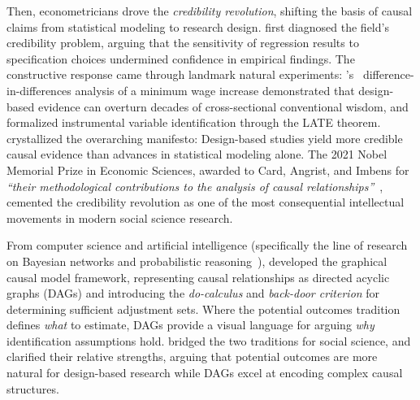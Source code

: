 Then, econometricians drove the \emph{credibility revolution}, shifting the basis of causal claims from statistical modeling to research design.
\citet{leamer1983let} first diagnosed the field's credibility problem, arguing that the sensitivity of regression results to specification choices undermined confidence in empirical findings.
The constructive response came through landmark natural experiments: \citeauthor{card1994minimum}'s~\cite{card1994minimum} difference-in-differences analysis of a minimum wage increase demonstrated that design-based evidence can overturn decades of cross-sectional conventional wisdom, and \citet{angrist1996identification} formalized instrumental variable identification through the LATE theorem.
\citet{angrist2010credibility} crystallized the overarching manifesto: Design-based studies yield more credible causal evidence than advances in statistical modeling alone.
The 2021 Nobel Memorial Prize in Economic Sciences, awarded to Card, Angrist, and Imbens for \emph{``their methodological contributions to the analysis of causal relationships''}~\cite{nobelprize2021economics}, cemented the credibility revolution as one of the most consequential intellectual movements in modern social science research.

From computer science and artificial intelligence (specifically the line of research on Bayesian networks and probabilistic reasoning~\cite{pearl1988probabilistic}), \citet{pearl2009causality} developed the graphical causal model framework, representing causal relationships as directed acyclic graphs (DAGs) and introducing the \emph{do-calculus} and \emph{back-door criterion} for determining sufficient adjustment sets.
Where the potential outcomes tradition defines \emph{what} to estimate, DAGs provide a visual language for arguing \emph{why} identification assumptions hold.
\citet{morgan2015counterfactuals} bridged the two traditions for social science, and \citet{imbens2020potential} clarified their relative strengths, arguing that potential outcomes are more natural for design-based research while DAGs excel at encoding complex causal structures.

